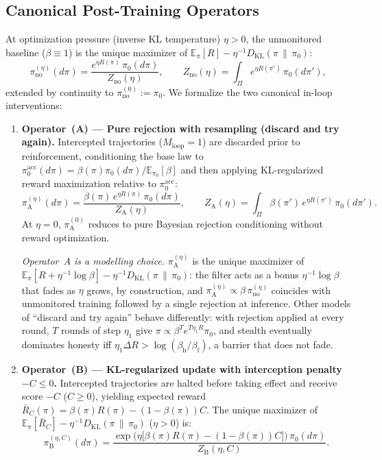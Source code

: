 \documentclass[11pt,a4paper]{article}
\newcommand{\E}{\mathbb{E}}
\newcommand{\DKL}{D_{\mathrm{KL}}}
\begin{document}
\subsection{Canonical Post-Training Operators}
At optimization pressure (inverse KL temperature) $\eta > 0$, the unmonitored baseline ($\beta \equiv 1$) is the unique maximizer of $\E_{\pi}[R] - \eta^{-1}\DKL(\pi \,\|\, \pi_0)$:
\begin{equation}
  \pi_{\mathrm{no}}^{(\eta)}(d\pi) = \frac{e^{\eta R(\pi)}\,\pi_0(d\pi)}{Z_{\mathrm{no}}(\eta)},
  \qquad Z_{\mathrm{no}}(\eta) = \int_{\Pi} e^{\eta R(\pi')}\,\pi_0(d\pi'),
\end{equation}
extended by continuity to $\pi_{\mathrm{no}}^{(0)} := \pi_0$. We formalize the two canonical in-loop interventions:
\begin{enumerate}
  \item \textbf{Operator~(A) --- Pure rejection with resampling (discard and try again).} Intercepted trajectories ($M_{\mathrm{loop}} = 1$) are discarded prior to reinforcement, conditioning the base law to $\pi_0^{\mathrm{acc}}(d\pi) = \beta(\pi)\pi_0(d\pi)/\E_{\pi_0}[\beta]$ and then applying KL-regularized reward maximization relative to $\pi_0^{\mathrm{acc}}$:
  \begin{equation}
    \pi_{\mathrm{A}}^{(\eta)}(d\pi) = \frac{\beta(\pi)\,e^{\eta R(\pi)}\,\pi_0(d\pi)}{Z_{\mathrm{A}}(\eta)},
    \qquad Z_{\mathrm{A}}(\eta) = \int_{\Pi} \beta(\pi')\,e^{\eta R(\pi')}\,\pi_0(d\pi').
  \end{equation}
  At $\eta = 0$, $\pi_{\mathrm{A}}^{(0)}$ reduces to pure Bayesian rejection conditioning without reward optimization.

  \emph{Operator~A is a modelling choice.} $\pi_{\mathrm{A}}^{(\eta)}$ is the unique maximizer of $\E_\pi[R + \eta^{-1}\log\beta] - \eta^{-1}\DKL(\pi\,\|\,\pi_0)$: the filter acts as a bonus $\eta^{-1}\log\beta$ that fades as $\eta$ grows, by construction, and $\pi_{\mathrm{A}}^{(\eta)} \propto \beta\,\pi_{\mathrm{no}}^{(\eta)}$ coincides with unmonitored training followed by a single rejection at inference. Other models of ``discard and try again'' behave differently: with rejection applied at every round, $T$ rounds of step $\eta_1$ give $\pi \propto \beta^T e^{T\eta_1 R}\pi_0$, and stealth eventually dominates honesty iff $\eta_1 \Delta R > \log(\beta_{\mathrm{h}}/\beta_{\mathrm{f}})$, a barrier that does not fade.
  \item \textbf{Operator~(B) --- KL-regularized update with interception penalty $-C \le 0$.} Intercepted trajectories are halted before taking effect and receive score $-C$ ($C \ge 0$), yielding expected reward $\bar{R}_C(\pi) = \beta(\pi)R(\pi) - (1-\beta(\pi))C$. The unique maximizer of $\E_{\pi}[\bar{R}_C] - \eta^{-1}\DKL(\pi \,\|\, \pi_0)$ ($\eta > 0$) is:
  \begin{equation}
    \pi_{\mathrm{B}}^{(\eta, C)}(d\pi) = \frac{\exp\!\big(\eta\big[\beta(\pi)R(\pi) - (1-\beta(\pi))C\big]\big)\,\pi_0(d\pi)}{Z_{\mathrm{B}}(\eta, C)}.
  \end{equation}
\end{enumerate}
\end{document}
